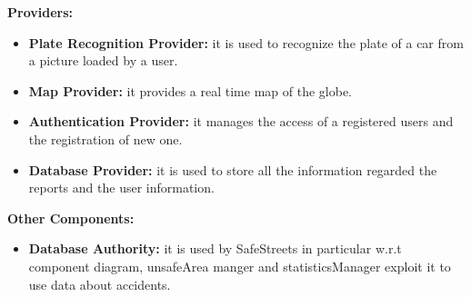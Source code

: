 \documentclass[../RASD.tex]{subfiles}
\begin{document}
    \textbf{Providers:}
    \\
    \begin{itemize}
        \item \textbf{Plate Recognition Provider:} it is used to recognize the plate of a car from a picture loaded by a user.
        \item \textbf{Map Provider:} it provides a real time map of the globe.
        \item \textbf{Authentication Provider:} it manages the access of a registered users and the registration of new one.
        \item \textbf{Database Provider:} it is used to store all the information regarded the reports and the user information.
    \end{itemize}
    \textbf{Other Components:}
    \\
    \begin{itemize}
        \item \textbf{Database Authority:} it is used by SafeStreets in particular w.r.t component diagram, unsafeArea manger and statisticsManager
        exploit it to use data about accidents.
    \end{itemize}
    \newpage
\end{document}
